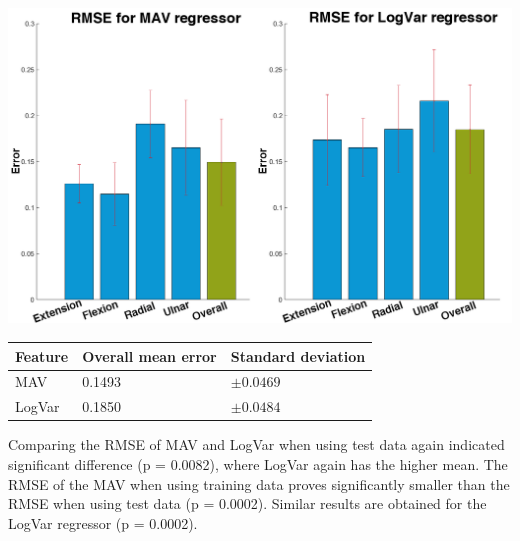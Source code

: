 \documentclass[landscape,a0paper,fontscale=0.375]{baposter} %
\begin{document}
\begin{poster}
{\begin{multicols}{2}
\begin{center}
	\includegraphics[width=1\linewidth]{RMSEBarPlotNewData}
\end{center}
	
	\begin{center}
		\begin{tabular}{l l l}
			\toprule
			\textbf{Feature} & \textbf{Overall mean error} & \textbf{Standard deviation}\\
			\midrule
			MAV & 0.1493 & $\pm 0.0469$ \\
			LogVar & 0.1850 & $\pm 0.0484$ \\
			\bottomrule
		\end{tabular}
	\end{center}

Comparing the RMSE of MAV and LogVar when using test data again indicated significant difference (p = 0.0082), where LogVar again has the higher mean. The RMSE of the MAV when using training data proves significantly smaller than the RMSE when using test data (p = 0.0002). Similar results are obtained for the LogVar regressor (p = 0.0002).

\end{multicols}
\vspace{1em}


%
%
% 
}


\end{poster}
\end{document}
